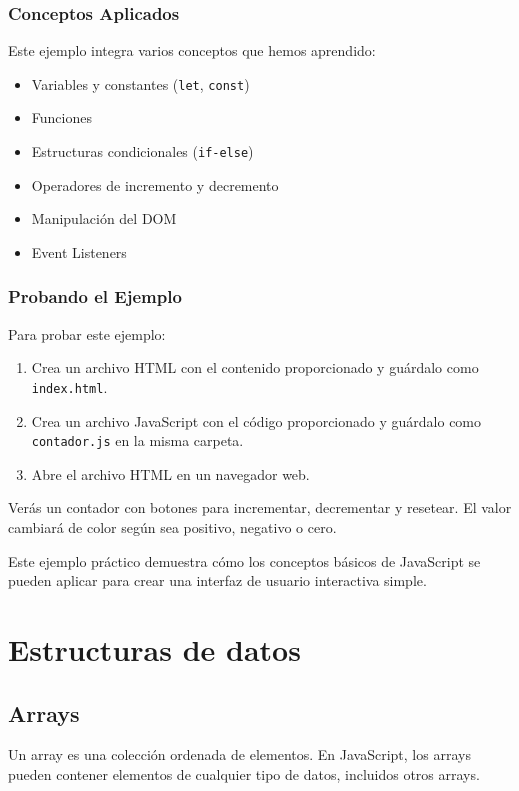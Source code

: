 \documentclass{book}
\begin{document}
\subsection{Conceptos Aplicados}
Este ejemplo integra varios conceptos que hemos aprendido:

\begin{itemize}
    \item Variables y constantes (\texttt{let}, \texttt{const})
    \item Funciones
    \item Estructuras condicionales (\texttt{if-else})
    \item Operadores de incremento y decremento
    \item Manipulación del DOM
    \item Event Listeners
\end{itemize}

\subsection{Probando el Ejemplo}
Para probar este ejemplo:

\begin{enumerate}
    \item Crea un archivo HTML con el contenido proporcionado y guárdalo como \texttt{index.html}.
    \item Crea un archivo JavaScript con el código proporcionado y guárdalo como \texttt{contador.js} en la misma carpeta.
    \item Abre el archivo HTML en un navegador web.
\end{enumerate}

Verás un contador con botones para incrementar, decrementar y resetear. El valor cambiará de color según sea positivo, negativo o cero.

Este ejemplo práctico demuestra cómo los conceptos básicos de JavaScript se pueden aplicar para crear una interfaz de usuario interactiva simple.
\newpage

\chapter{Estructuras de datos}
\section{Arrays}
Un array es una colección ordenada de elementos. En JavaScript, los arrays pueden contener elementos de cualquier tipo de datos, incluidos otros arrays.
\end{document}
